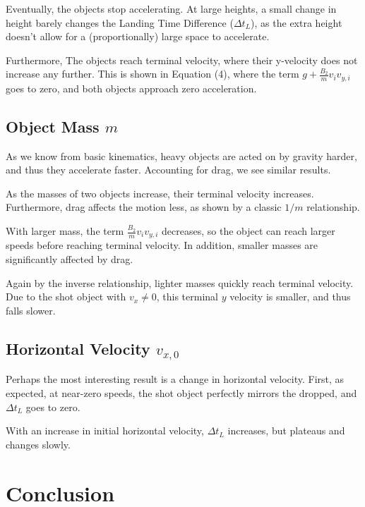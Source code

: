 \documentclass{article}
\begin{document}
	Eventually, the objects stop accelerating. At large heights, a small change in height barely changes the Landing Time Difference ($\Delta t_L$), as the extra height doesn't allow for a (proportionally) large space to accelerate. 
	
	Furthermore, The objects reach terminal velocity, where their y-velocity does not increase any further. This is shown in Equation (4), where the term $g+\frac{B_2}{m}v_iv_{y,i}$ goes to zero, and both objects approach zero acceleration.
	\subsection{Object Mass $m$}
	As we know from basic kinematics, heavy objects are acted on by gravity harder, and thus they accelerate faster. Accounting for drag, we see similar results. 
	
	As the masses of two objects increase, their terminal velocity increases. Furthermore, drag affects the motion less, as shown by a classic $1/m$ relationship. 
	
	With larger mass, the term $\frac{B_2}{m}v_iv_{y,i}$ decreases, so the object can reach larger speeds before reaching terminal velocity. In addition, smaller masses are significantly affected by drag. 
	
	Again by the inverse relationship, lighter masses quickly reach terminal velocity. Due to the shot object with $v_x\ne0$, this terminal $y$ velocity is smaller, and thus falls slower. 
	\subsection{Horizontal Velocity $v_{x,0}$}
	Perhaps the most interesting result is a change in horizontal velocity. First, as expected, at near-zero speeds, the shot object perfectly mirrors the dropped, and $\Delta t_L$ goes to zero. 
	
	With an increase in initial horizontal velocity, $\Delta t_L$ increases, but plateaus and changes slowly. 
	\section{Conclusion}

	
	
	
	
\end{document}

